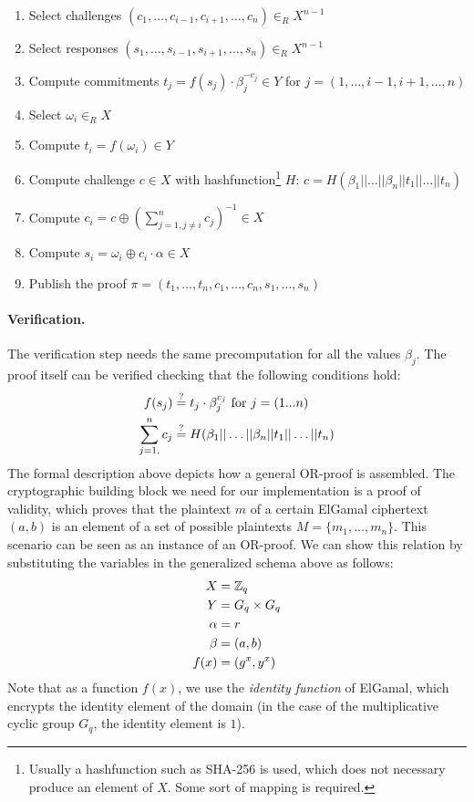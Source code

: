 \documentclass[numbers=noenddot, abstract=on, a4paper, headsepline,
footsepline, oneside, draft=off]{scrreprt}
\begin{document}
\begin{enumerate}  
  \item Select challenges $(c_1, \ldots, c_{i-1}, c_{i+1}, \ldots, c_n) \in_R
  X^{n-1}$
  \item Select responses $(s_1, \ldots, s_{i-1}, s_{i+1}, \ldots, s_n) \in_R
  X^{n-1}$
  \item Compute commitments $t_j=f(s_j) \cdot \beta_j^{-c_j} \in Y$ for
  $j=(1, \ldots, i-1, i+1, \ldots, n)$
  \item Select $\omega_i \in_R X$
  \item Compute $t_i=f(\omega_i) \in Y$
  \item Compute challenge $c\in X$ with hashfunction\footnote{Usually a
  hashfunction such as SHA-256 is used, which does not necessary produce an
  element of $X$. Some sort of mapping is required.} $H$:
  $c=H(\beta_1||\ldots||\beta_n||t_1||\ldots||t_n)$
  \item Compute $c_i=c\oplus(\sum_{j=1, j \neq i}^n c_j)^{-1} \in X$
  \item Compute $s_i=\omega_i \oplus c_i \cdot \alpha \in X$
  \item Publish the proof $\pi = (t_1,\ldots,t_n,c_1,\ldots,c_n,s_1,\ldots,s_n)$
\end{enumerate}

\paragraph{Verification.} The verification step needs the same precomputation
for all the values $\beta_j$. The proof itself can be verified checking that
the following conditions hold:
\begin{align}
	f(s_j) &\stackrel{?}{=} t_j \cdot \beta_j^{c_j} \text{ for } j=(1...n)
	\notag \\
	 \sum_{j=1,}^n c_j &\stackrel{?}{=}
	 H(\beta_1||\ldots||\beta_n||t_1||\ldots||t_n)
	 \notag
\end{align}
The formal description above depicts how a general OR-proof is assembled. The
cryptographic building block we need for our implementation is a proof of
validity, which proves that the plaintext $m$ of a certain ElGamal ciphertext
$(a, b)$ is an element of a set of possible plaintexts $M=\{m_1, \ldots, m_n\}$. This
scenario can be seen as an instance of an OR-proof. We can show this relation by
substituting the variables in the generalized schema above as follows:
\begin{align}
  X &= \mathbb{Z}_q \notag \\
  Y &= G_q \times G_q \notag \\
  \alpha &=r \notag \\
  \beta &=(a, b) \notag \\
  f(x) &= (g^x, y^x) \notag
\end{align} 
Note that as a function $f(x)$, we use the \emph{identity function} of ElGamal,
which encrypts the identity element of the domain (in the case of the
multiplicative cyclic group $G_q$, the identity element is $1$).
\end{document}

